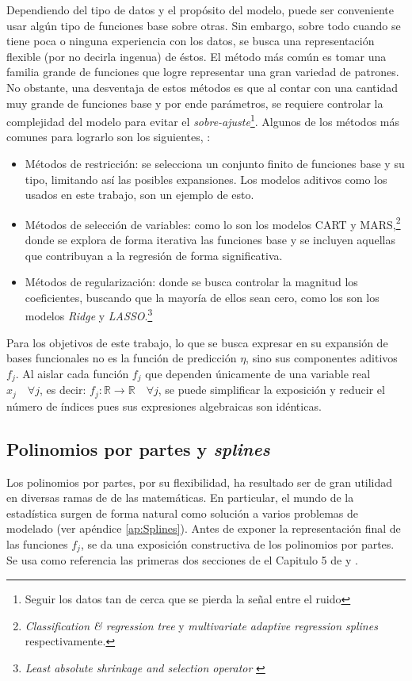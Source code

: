 \documentclass[../Main/Main.tex]{subfiles}
\begin{document}
Dependiendo del tipo de datos y el propósito del modelo, puede ser conveniente usar algún tipo de funciones base sobre otras. Sin embargo, sobre todo cuando se tiene poca o ninguna experiencia con los datos, se busca una representación flexible (por no decirla ingenua) de éstos. El método más común es tomar una familia grande de funciones que logre representar una gran variedad de patrones. No obstante, una desventaja de estos métodos es que al contar con una cantidad muy grande de funciones base y por ende parámetros, se requiere controlar la complejidad del modelo para evitar el \textit{sobre-ajuste}\footnote{Seguir los datos tan de cerca que se pierda la señal entre el ruido}. Algunos de los métodos más comunes para lograrlo son los siguientes, \citet{hastie2008elements}:
\begin{itemize}[label={}]
	\item Métodos de restricción: se selecciona un conjunto finito de funciones base y su tipo, limitando así las posibles expansiones. Los modelos aditivos como los usados en este trabajo, son un ejemplo de esto.  
	\item Métodos de selección de variables: como lo son los modelos CART y MARS,\footnote{\textit{Classification \& regression tree} \autocite{breiman1984classification} y \textit{multivariate adaptive regression splines} \autocite{friedman1991multivariate} respectivamente.} donde se explora de forma iterativa las funciones base y se incluyen aquellas que contribuyan a la regresión de forma significativa.
	\item Métodos de regularización: donde se busca controlar la magnitud los coeficientes, buscando que la mayoría de ellos sean cero, como los son los modelos \textit{Ridge} y  \textit{LASSO}.\footnote{\textit{Least absolute shrinkage and selection operator} \autocite{hoerl1970ridge, tibshirani1996regression}}
\end{itemize}

Para los objetivos de este trabajo, lo que se busca expresar en su expansión de bases funcionales no es la función de predicción $\eta$, sino sus componentes aditivos $f_j$. Al aislar cada función $f_j$ que dependen únicamente de una variable real $x_j \quad \forall j$, es decir: $f_j:\mathbb{R}\rightarrow\mathbb{R} \quad \forall j$, se puede simplificar la exposición y reducir el número de índices pues sus expresiones algebraicas son idénticas.

\subsection{Polinomios por partes y \textit{splines}} \label{sec:PolisYSplines}
Los polinomios por partes, por su flexibilidad, ha resultado ser de gran utilidad en diversas ramas de de las matemáticas. En particular, el mundo de la estadística surgen de forma natural como solución a varios problemas de modelado (ver apéndice \ref{ap:Splines}). Antes de exponer la representación final de las funciones $f_j$, se da una exposición constructiva de los polinomios por partes. Se usa como referencia las primeras dos secciones de el Capitulo 5 de \citet{hastie2008elements} y \citet{wahba1990splines}. 
\end{document}
